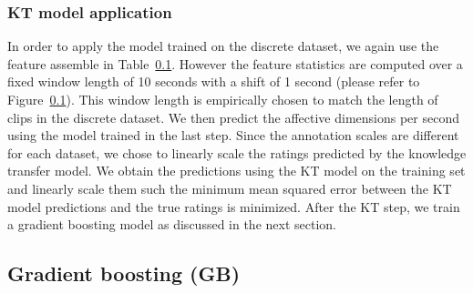 \documentclass{article}
\begin{document}
\subsubsection{KT model application}
In order to apply the model trained on the discrete dataset, we again use the feature assemble in Table~\ref{}.
However the feature statistics are computed over a fixed window length of 10 seconds with a shift of 1 second (please refer to Figure~\ref{}). 
This window length is empirically chosen to match the length of clips in the discrete dataset.
We then predict the affective dimensions per second using the model trained in the last step.
Since the annotation scales are different for each dataset, we chose to linearly scale the ratings predicted by the knowledge transfer model.
We obtain the predictions using the KT model on the training set and linearly scale them such the minimum mean squared error between the KT model predictions and the true ratings is minimized. 
After the KT step, we train a gradient boosting model as discussed in the next section. 


\subsection{Gradient boosting (GB)}

\end{document}
